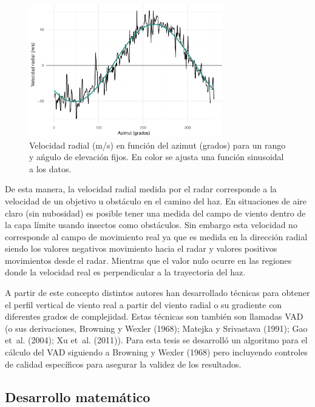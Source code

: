 \documentclass[12pt,spanish,oneside]{book}
\begin{document}
\begin{figure}

{\centering \includegraphics[width=0.75\textwidth]{Tesis_files/figure-latex/vad-1} 

}

\caption{Velocidad radial (m/s) en función del azimut (grados) para un rango y ańgulo de elevación fijos. En color se  ajusta una función sinusoidal a los datos. \label{vad}}\label{fig:vad}
\end{figure}

De esta manera, la velocidad radial medida por el radar corresponde a la
velocidad de un objetivo u obstáculo en el camino del haz. En
situaciones de aire claro (sin nubosidad) es posible tener una medida
del campo de viento dentro de la capa límite usando insectos como
obstáculos. Sin embargo esta velocidad no corresponde al campo de
movimiento real ya que es medida en la dirección radial siendo los
valores negativos movimiento hacia el radar y valores positivos
movimientos desde el radar. Mientras que el valor nulo ocurre en las
regiones donde la velocidad real es perpendicular a la trayectoria del
haz.

A partir de este concepto distintos autores han desarrollado técnicas
para obtener el perfil vertical de viento real a partir del viento
radial o su gradiente con diferentes grados de complejidad. Estas
técnicas son también son llamadas VAD (o sus derivaciones, Browning y
Wexler (1968); Matejka y Srivastava (1991); Gao et~al. (2004); Xu et~al.
(2011)). Para esta tesis se desarrolló un algoritmo para el cálculo del
VAD siguiendo a Browning y Wexler (1968) pero incluyendo controles de
calidad específicos para asegurar la validez de los resultados.

\subsection{Desarrollo matemático}\label{desarrollo-matematico}
\end{document}
